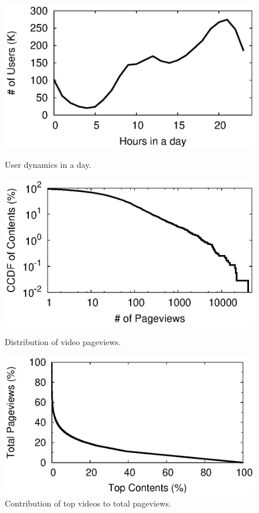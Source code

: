 \begin{figure}[t]
\begin{minipage}{0.32\textwidth}
 \centering
	\includegraphics[width=1\textwidth]{plots/basic/dynamic_by_hour.eps}
	\caption{User dynamics in a day.}
	\label{fig:user_dynamic_hour}
\end{minipage}
\hfill
\begin{minipage}{0.32\textwidth}
 \centering
	\includegraphics[width=1\textwidth]{plots/basic/ccdf_content_pageviews.eps}
	\caption{Distribution of video pageviews.}
	\label{fig:cdf_content_pv}
\end{minipage}
\hfill
\begin{minipage}{0.32\textwidth}
 \centering
	\includegraphics[width=1\textwidth]{plots/basic/top_video_pageviews.eps}
	\caption{Contribution of top videos to total pageviews.}
	\label{fig:top_video_pv}
\end{minipage}

\end{figure}